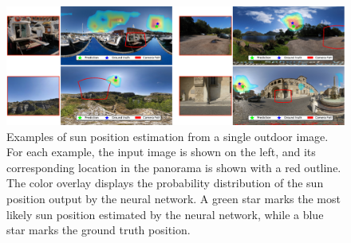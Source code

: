 \newcommand{\EvalHeight}{3.5cm}
\newcommand{\RndrHght}{3.2cm}
\newcommand{\RndrWdth}{4.1cm}
\newcommand{\CropWidth}{3.4cm}
\newcommand{\CropHght}{2.5cm}
\newcommand{\PanoWidth}{5.0cm}

\begin{figure}
    \centering
    \includegraphics[width=\linewidth]{figures/sunpos_estim/sunpos.pdf}
    \caption[Examples of sun position estimation from a single outdoor image]{Examples of sun position estimation from a single outdoor image. For each example, the input image is shown on the left, and its corresponding location in the panorama is shown with a red outline. The color overlay displays the probability distribution of the sun position output by the neural network. A green star marks the most likely sun position estimated by the neural network, while a blue star marks the ground truth position. }
    \label{fig:evaluation_example_sun_position}
\end{figure}


